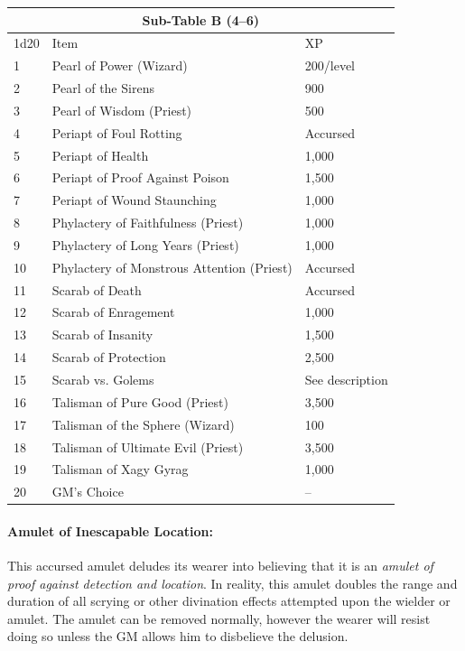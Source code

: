 \begin{multicols}{2}
\begin{minipage}{\columnwidth}
\end{minipage}

\noindent
\begin{tabular}{|p{}|p{}|p{}|}
\multicolumn{3}{c}{Sub-Table B (4--6)} \\
\hline
1d20	& Item	& XP \\
\hline\hline
\rowcolor[gray]{.9}1	& Pearl of Power (Wizard)	& 200/level \\
2	& Pearl of the Sirens	& 900 \\
\rowcolor[gray]{.9}3	& Pearl of Wisdom (Priest)	& 500 \\
4	& Periapt of Foul Rotting	& Accursed \\
\rowcolor[gray]{.9}5	& Periapt of Health	& 1,000 \\
6	& Periapt of Proof Against Poison	& 1,500 \\
\rowcolor[gray]{.9}7	& Periapt of Wound Staunching	& 1,000 \\
8	& Phylactery of Faithfulness (Priest)	& 1,000 \\
\rowcolor[gray]{.9}9	& Phylactery of Long Years (Priest)	& 1,000 \\
10	& Phylactery of Monstrous Attention (Priest)	& Accursed \\
\rowcolor[gray]{.9}11	& Scarab of Death	& Accursed \\
12	& Scarab of Enragement	& 1,000 \\
\rowcolor[gray]{.9}13	& Scarab of Insanity	& 1,500 \\
14	& Scarab of Protection	& 2,500 \\
\rowcolor[gray]{.9}15	& Scarab vs. Golems	& See description \\
16	& Talisman of Pure Good (Priest)	& 3,500 \\
\rowcolor[gray]{.9}17	& Talisman of the Sphere (Wizard)	& 100 \\
18	& Talisman of Ultimate Evil (Priest)	& 3,500 \\
\rowcolor[gray]{.9}19	& Talisman of Xagy Gyrag	& 1,000 \\
20	& GM's Choice	& -- \\
\hline
\end{tabular}

\paragraph{Amulet of Inescapable Location:} This accursed amulet deludes its wearer into believing that it is an \textit{amulet of proof against detection and location}.  In reality, this amulet doubles the range and duration of all scrying or other divination effects attempted upon the wielder or amulet.  The amulet can be removed normally, however the wearer will resist doing so unless the GM allows him to disbelieve the delusion.


\end{multicols}
